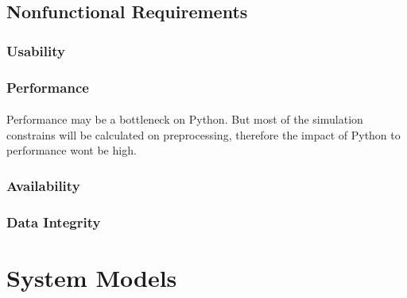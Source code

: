 \documentclass[a4paper, 12pt]{article}
\begin{document}
        \subsection{Nonfunctional Requirements} \paragraph{}
            \subsubsection{Usability} \paragraph{}
            \subsubsection{Performance} \paragraph{}
                Performance may be a bottleneck on \gls{Python}. But most of the simulation constrains will be calculated on preprocessing, therefore the impact of \gls{Python} to performance wont be high.
            \subsubsection{Availability} \paragraph{}
                
            \subsubsection{Data Integrity} \paragraph{}
    \section{System Models} \paragraph{}

    \printnoidxglossaries

    \printbibliography[
        heading=bibnumbered,
        title={References}]
    
\end{document}

